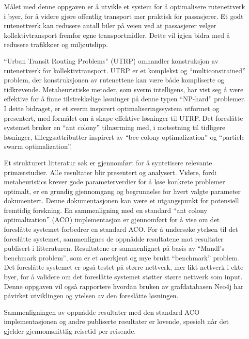 Målet med denne oppgaven er å utvikle et system for å optimalisere rutenettverk i byer, for å videre gjøre offentlig transport mer praktisk for passasjerer. Et godt rutenettverk kan redusere antall biler på veien ved at passasjerer velger kollektivtransport fremfor egne transportmidler. Dette vil igjen bidra med å redusere trafikkøer og miljøutslipp.

``Urban Transit Routing Problems'' (UTRP) omhandler konstruksjon av rutenettverk for kollektivtransport. UTRP er et komplekst og ``multiconstrained'' problem, der konstruksjonen av rutenettene kan være både kompliserte og tidkrevende. Metaheuristiske metoder, som sverm intelligens, har vist seg å være effektive for å finne tilstrekkelige løsninger på denne typen ``NP-hard'' problemer. I dette bidraget, er et sverm inspirert optimaliseringssystem utformet og presentert, med formålet om å skape effektive løsninger til UTRP. Det foreslåtte systemet bruker en ``ant colony'' tilnærming med, i motsetning til tidligere løsninger, tilleggsattributter inspirert av ``bee colony optimalization'' og ``particle swarm optimalization''.

Et strukturert litteratur søk er gjennomført for å syntetisere relevante primærstudier. Alle resultater blir presentert og analysert. Videre, fordi metaheuristics krever gode parameterverdier for å løse konkrete problemer optimalt, er en grundig gjennomgang og begrunnelse for hvert valgte parameter dokumentert. Denne dokumentasjonen kan være et utgangspunkt for potensiell fremtidig forskning. En sammenligning med en standard ``ant colony optimalization'' (ACO) implementasjon er gjennomført for å vise om det foreslåtte systemet forbedrer en standard ACO. For å undersøke ytelsen til det foreslåtte systemet, sammenlignes de oppnådde resultatene mot resultater publisert i litteraturen. Resultatene er sammenlignet på basis av ``Mandl's benchmark problem'', som er et anerkjent og mye brukt ``benchmark'' problem. Det foreslåtte systemet er også testet på større nettverk, mer likt nettverk i ekte byer, for å validere om det foreslåtte systemet støtter større nettverk som input. Denne oppgaven vil også rapportere hvordan bruken av grafdatabasen Neo4j har påvirket utviklingen og ytelsen av den foreslåtte løsningen.

Sammenligningen av oppnådde resultater med den standard ACO implementasjonen og andre publiserte resultater er lovende, spesielt når det gjelder gjennomsnittlig reisetid per reisende.
